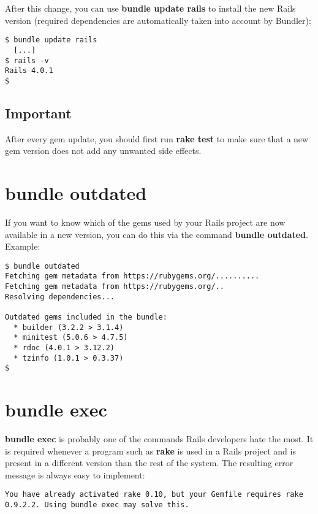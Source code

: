 \documentclass[a4paper]{book}
\begin{document}
After this change, you can use \textbf{bundle update rails} to install the new Rails version (required dependencies are automatically taken into account by Bundler):

\begin{shaded}\begin{verbatim}
$ bundle update rails
  [...]
$ rails -v
Rails 4.0.1
$
\end{verbatim}\end{shaded}

\subsection{Important}\label{important-14}

After every gem update, you should first run \textbf{rake test} to make sure that a new gem version does not add any unwanted side effects.

\section{bundle outdated}\label{bundle-outdated}

If you want to know which of the gems used by your Rails project are now available in a new version, you can do this via the command \textbf{bundle outdated}. Example:

\begin{shaded}\begin{verbatim}
$ bundle outdated
Fetching gem metadata from https://rubygems.org/..........
Fetching gem metadata from https://rubygems.org/..
Resolving dependencies...

Outdated gems included in the bundle:
  * builder (3.2.2 > 3.1.4)
  * minitest (5.0.6 > 4.7.5)
  * rdoc (4.0.1 > 3.12.2)
  * tzinfo (1.0.1 > 0.3.37)
$
\end{verbatim}\end{shaded}

\section{bundle exec}\label{bundle-exec}

\textbf{bundle exec} is probably one of the commands Rails developers hate the most. It is required whenever a program such as \textbf{rake} is used in a Rails project and is present in a different version than the rest of the system. The resulting error message is always easy to implement:

\begin{shaded}\begin{verbatim}
You have already activated rake 0.10, but your Gemfile requires rake 0.9.2.2. Using bundle exec may solve this.
\end{verbatim}\end{shaded}
\end{document}
